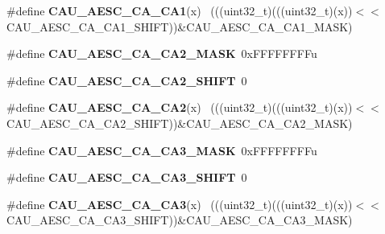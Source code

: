 \begin{DoxyCompactItemize}
\item 
\hypertarget{group___c_a_u___register___masks_ga2e19d2a1d2cb3157d6f6fd419b6afc86}{}\#define {\bfseries C\+A\+U\+\_\+\+A\+E\+S\+C\+\_\+\+C\+A\+\_\+\+C\+A1}(x)                                          ~(((uint32\+\_\+t)(((uint32\+\_\+t)(x))$<$$<$C\+A\+U\+\_\+\+A\+E\+S\+C\+\_\+\+C\+A\+\_\+\+C\+A1\+\_\+\+S\+H\+I\+F\+T))\&C\+A\+U\+\_\+\+A\+E\+S\+C\+\_\+\+C\+A\+\_\+\+C\+A1\+\_\+\+M\+A\+S\+K)\label{group___c_a_u___register___masks_ga2e19d2a1d2cb3157d6f6fd419b6afc86}

\item 
\hypertarget{group___c_a_u___register___masks_ga228d26ca32382c1c7fc31336cab80532}{}\#define {\bfseries C\+A\+U\+\_\+\+A\+E\+S\+C\+\_\+\+C\+A\+\_\+\+C\+A2\+\_\+\+M\+A\+S\+K}~0x\+F\+F\+F\+F\+F\+F\+F\+Fu\label{group___c_a_u___register___masks_ga228d26ca32382c1c7fc31336cab80532}

\item 
\hypertarget{group___c_a_u___register___masks_gafb8c8ffc45b20809178af540f5c15280}{}\#define {\bfseries C\+A\+U\+\_\+\+A\+E\+S\+C\+\_\+\+C\+A\+\_\+\+C\+A2\+\_\+\+S\+H\+I\+F\+T}~0\label{group___c_a_u___register___masks_gafb8c8ffc45b20809178af540f5c15280}

\item 
\hypertarget{group___c_a_u___register___masks_ga19a8788f22b0371b526267e14c4bc12c}{}\#define {\bfseries C\+A\+U\+\_\+\+A\+E\+S\+C\+\_\+\+C\+A\+\_\+\+C\+A2}(x)                                          ~(((uint32\+\_\+t)(((uint32\+\_\+t)(x))$<$$<$C\+A\+U\+\_\+\+A\+E\+S\+C\+\_\+\+C\+A\+\_\+\+C\+A2\+\_\+\+S\+H\+I\+F\+T))\&C\+A\+U\+\_\+\+A\+E\+S\+C\+\_\+\+C\+A\+\_\+\+C\+A2\+\_\+\+M\+A\+S\+K)\label{group___c_a_u___register___masks_ga19a8788f22b0371b526267e14c4bc12c}

\item 
\hypertarget{group___c_a_u___register___masks_ga2acd3c4e0bdc22621d5a9992adcc571e}{}\#define {\bfseries C\+A\+U\+\_\+\+A\+E\+S\+C\+\_\+\+C\+A\+\_\+\+C\+A3\+\_\+\+M\+A\+S\+K}~0x\+F\+F\+F\+F\+F\+F\+F\+Fu\label{group___c_a_u___register___masks_ga2acd3c4e0bdc22621d5a9992adcc571e}

\item 
\hypertarget{group___c_a_u___register___masks_gacb3a23977b7f207a38793d67e7cf5691}{}\#define {\bfseries C\+A\+U\+\_\+\+A\+E\+S\+C\+\_\+\+C\+A\+\_\+\+C\+A3\+\_\+\+S\+H\+I\+F\+T}~0\label{group___c_a_u___register___masks_gacb3a23977b7f207a38793d67e7cf5691}

\item 
\hypertarget{group___c_a_u___register___masks_gaa098ecd2ee1b677e343f5f08db92694b}{}\#define {\bfseries C\+A\+U\+\_\+\+A\+E\+S\+C\+\_\+\+C\+A\+\_\+\+C\+A3}(x)                                          ~(((uint32\+\_\+t)(((uint32\+\_\+t)(x))$<$$<$C\+A\+U\+\_\+\+A\+E\+S\+C\+\_\+\+C\+A\+\_\+\+C\+A3\+\_\+\+S\+H\+I\+F\+T))\&C\+A\+U\+\_\+\+A\+E\+S\+C\+\_\+\+C\+A\+\_\+\+C\+A3\+\_\+\+M\+A\+S\+K)\label{group___c_a_u___register___masks_gaa098ecd2ee1b677e343f5f08db92694b}


\end{DoxyCompactItemize}
